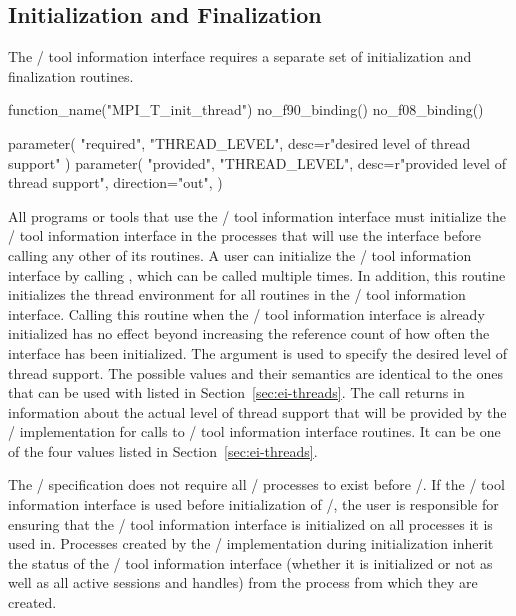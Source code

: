 \subsection{Initialization and Finalization}
\label{sec:mpit:init}

The \MPI/ tool information interface requires a separate set of
initialization and finalization routines.

\begin{mpi-binding}
    function_name("MPI_T_init_thread")
    no_f90_binding()
    no_f08_binding()
    
    parameter(
        "required", "THREAD_LEVEL", desc=r"desired level of thread support"
    )
    parameter(
        "provided",
        "THREAD_LEVEL",
        desc=r"provided level of thread support",
        direction="out",
    )
\end{mpi-binding}

All programs or tools that use the \MPI/ tool information interface must
initialize the \MPI/ tool information interface in the processes that will
use the interface before calling any other of its routines.  A user can
initialize the \MPI/ tool information interface by calling
, which can be called multiple times.  In
addition, this routine initializes the thread environment for all routines
in the \mpi/ tool information interface.  Calling this routine when the
\MPI/ tool information interface is already initialized has no effect
beyond increasing the reference count of how often the interface has been
initialized.  The argument  is used to specify the desired
level of thread support.  The possible values and their semantics are
identical to the ones that can be used with 
listed in Section~\ref{sec:ei-threads}.  The call returns in
 information about the actual level of thread support that
will be provided by the \MPI/ implementation for calls to \MPI/ tool
information interface routines.  It can be one of the four values listed in
Section~\ref{sec:ei-threads}.

The \MPI/ specification does not require all \MPI/ processes to exist
before \MPIisinitialized/.  If the \MPI/ tool information
interface is used before initialization of \MPI/, the user is
responsible for ensuring that the \MPI/ tool information interface is
initialized on all processes it is used in.  Processes created by the \MPI/
implementation during initialization inherit the status of the \MPI/
tool information interface (whether it is initialized or not as well as all
active sessions and handles) from the process from which they are created.

